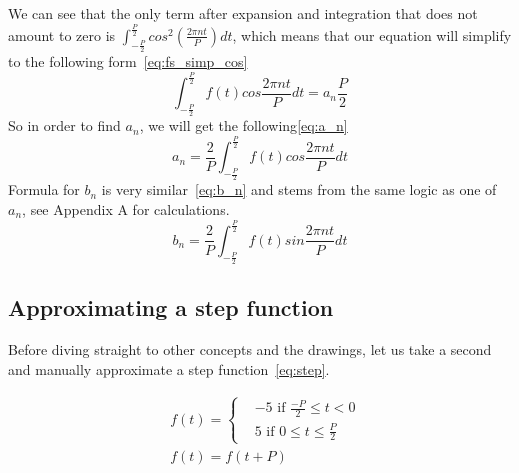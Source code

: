 \documentclass{article}
\begin{document}
    We can see that the only term after expansion and integration that does not 
    amount to zero is $\int_{-\frac{P}{2}}^{\frac{P}{2}}cos^2(\frac{2\pi nt}{P})dt$,
    which means that our equation will simplify to the following form~\eqref{eq:fs_simp_cos}
    \begin{equation}\label{eq:fs_simp_cos}
        \int_{-\frac{P}{2}}^{\frac{P}{2}}f(t)cos\frac{2\pi nt}{P}dt = a_n\frac{P}{2}
    \end{equation}
    So in order to find $a_n$, we will get the following\eqref{eq:a_n}
    \begin{equation}\label{eq:a_n}
        a_n = \frac{2}{P}\int_{-\frac{P}{2}}^{\frac{P}{2}}f(t)cos\frac{2\pi nt}{P}dt
    \end{equation}
    Formula for $b_n$ is very similar~\eqref{eq:b_n} and stems from the same logic as one of 
    $a_n$, see Appendix A for calculations.
    \begin{equation}\label{eq:b_n}
        b_n = \frac{2}{P}\int_{-\frac{P}{2}}^{\frac{P}{2}}f(t)sin\frac{2\pi nt}{P}dt
    \end{equation}

\subsection{Approximating a step function}
    
    Before diving straight to other concepts and the drawings, let us 
    take a second and manually approximate a step function~\eqref{eq:step}.

    \begin{equation}\label{eq:step}
    \begin{split}
         &f(t) = 
        \begin{cases} 
            & -5 \text{ if } \frac{-P}{2} \leq t < 0 \\
            & 5 \text{ if }  0 \leq t \leq \frac{P}{2}
        \end{cases} \\
        & f(t) = f(t + P) 
    \end{split}
    \end{equation}
\end{document}
